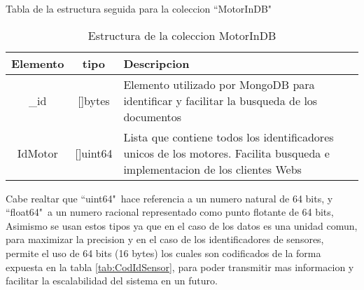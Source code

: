 \vspace{1cm}


    \begin{table}[h!]
        \begin{center}
            Tabla de la estructura seguida para la coleccion ``MotorInDB"\ \\
            \vspace{0.3cm}
            \begin{tabular}{|c|c|p{11cm}|}
                \hline
                Elemento & tipo     & Descripcion \\\hline\hline
                \_id      & []bytes  & Elemento utilizado por MongoDB para
                identificar y facilitar la busqueda de los documentos\\\hline
                IdMotor  & []uint64 & Lista que contiene todos los identificadores
                unicos de los motores. Facilita busqueda e implementacion de los
                clientes Webs\\\hline
            \end{tabular}
        \end{center}
        \caption[Estructura de MotorInDB]{Estructura de la coleccion MotorInDB}
        \label{tab:MotorInDBbson}
    \end{table}

    Cabe realtar que ``uint64"\  hace referencia a un numero natural de 64 bits, y
    ``float64"\  a un numero racional representado como punto flotante de 64 bits,
    Asimismo se usan estos tipos ya que en el caso de los datos es una unidad
    comun, para maximizar la precision y en el caso de los identificadores de
    sensores, permite el uso de 64 bits (16 bytes) los cuales son codificados de
    la forma expuesta en la tabla \ref{tab:CodIdSensor}, para
    poder transmitir mas informacion y facilitar la escalabilidad del sistema en
    un futuro.


